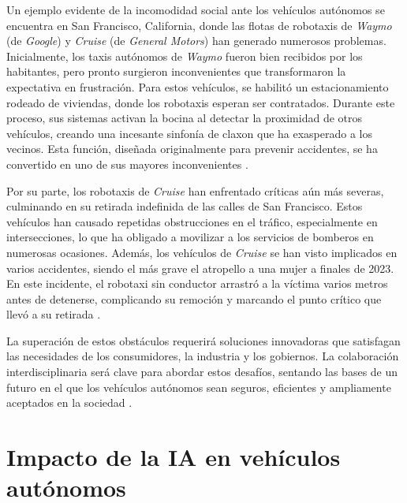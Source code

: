 Un ejemplo evidente de la incomodidad social ante los vehículos autónomos se encuentra en San Francisco, California, donde las flotas de robotaxis de \textit{Waymo} (de \textit{Google}) y \textit{Cruise} (de \textit{General Motors}) han generado numerosos problemas. Inicialmente, los taxis autónomos de \textit{Waymo} fueron bien recibidos por los habitantes, pero pronto surgieron inconvenientes que transformaron la expectativa en frustración. Para estos vehículos, se habilitó un estacionamiento rodeado de viviendas, donde los robotaxis esperan ser contratados. Durante este proceso, sus sistemas activan la bocina al detectar la proximidad de otros vehículos, creando una incesante sinfonía de claxon que ha exasperado a los vecinos. Esta función, diseñada originalmente para prevenir accidentes, se ha convertido en uno de sus mayores inconvenientes \cite{robotaxis-waymo}.

Por su parte, los robotaxis de \textit{Cruise} han enfrentado críticas aún más severas, culminando en su retirada indefinida de las calles de San Francisco. Estos vehículos han causado repetidas obstrucciones en el tráfico, especialmente en intersecciones, lo que ha obligado a movilizar a los servicios de bomberos en numerosas ocasiones. Además, los vehículos de \textit{Cruise} se han visto implicados en varios accidentes, siendo el más grave el atropello a una mujer a finales de 2023. En este incidente, el robotaxi sin conductor arrastró a la víctima varios metros antes de detenerse, complicando su remoción y marcando el punto crítico que llevó a su retirada \cite{robotaxis-cruise}.

La superación de estos obstáculos requerirá soluciones innovadoras que satisfagan las necesidades de los consumidores, la industria y los gobiernos. La colaboración interdisciplinaria será clave para abordar estos desafíos, sentando las bases de un futuro en el que los vehículos autónomos sean seguros, eficientes y ampliamente aceptados en la sociedad \cite{challenges-autonomous}.

\section{Impacto de la IA en vehículos autónomos}
\label{sec:ia-intro}

